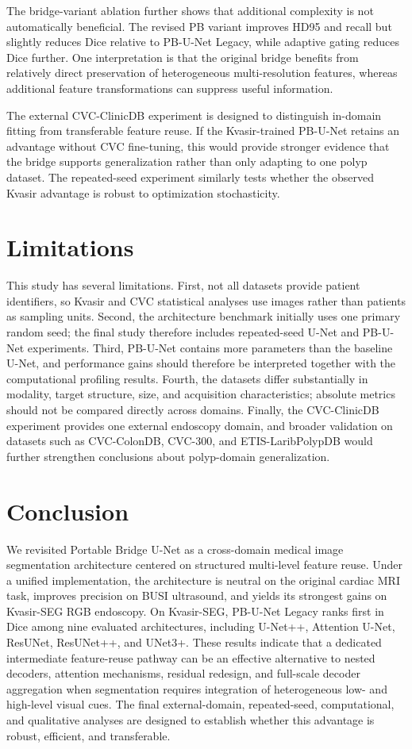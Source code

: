 \documentclass[11pt]{article}
\begin{document}
The bridge-variant ablation further shows that additional complexity is not automatically beneficial. The revised PB variant improves HD95 and recall but slightly reduces Dice relative to PB-U-Net Legacy, while adaptive gating reduces Dice further. One interpretation is that the original bridge benefits from relatively direct preservation of heterogeneous multi-resolution features, whereas additional feature transformations can suppress useful information.

The external CVC-ClinicDB experiment is designed to distinguish in-domain fitting from transferable feature reuse. If the Kvasir-trained PB-U-Net retains an advantage without CVC fine-tuning, this would provide stronger evidence that the bridge supports generalization rather than only adapting to one polyp dataset. The repeated-seed experiment similarly tests whether the observed Kvasir advantage is robust to optimization stochasticity.

\section{Limitations}
This study has several limitations. First, not all datasets provide patient identifiers, so Kvasir and CVC statistical analyses use images rather than patients as sampling units. Second, the architecture benchmark initially uses one primary random seed; the final study therefore includes repeated-seed U-Net and PB-U-Net experiments. Third, PB-U-Net contains more parameters than the baseline U-Net, and performance gains should therefore be interpreted together with the computational profiling results. Fourth, the datasets differ substantially in modality, target structure, size, and acquisition characteristics; absolute metrics should not be compared directly across domains. Finally, the CVC-ClinicDB experiment provides one external endoscopy domain, and broader validation on datasets such as CVC-ColonDB, CVC-300, and ETIS-LaribPolypDB would further strengthen conclusions about polyp-domain generalization.

\section{Conclusion}
We revisited Portable Bridge U-Net as a cross-domain medical image segmentation architecture centered on structured multi-level feature reuse. Under a unified implementation, the architecture is neutral on the original cardiac MRI task, improves precision on BUSI ultrasound, and yields its strongest gains on Kvasir-SEG RGB endoscopy. On Kvasir-SEG, PB-U-Net Legacy ranks first in Dice among nine evaluated architectures, including U-Net++, Attention U-Net, ResUNet, ResUNet++, and UNet3+. These results indicate that a dedicated intermediate feature-reuse pathway can be an effective alternative to nested decoders, attention mechanisms, residual redesign, and full-scale decoder aggregation when segmentation requires integration of heterogeneous low- and high-level visual cues. The final external-domain, repeated-seed, computational, and qualitative analyses are designed to establish whether this advantage is robust, efficient, and transferable.
\end{document}
